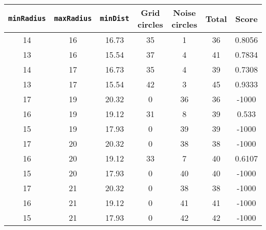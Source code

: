 \documentclass[letterpaper, 12pt]{article}
\begin{document}
\begin{longtable}{|c|c|c|c|c|c|c|}
\hline
\textbf{\texttt{minRadius}} & \textbf{\texttt{maxRadius}} & \textbf{\texttt{minDist}} & \textbf{Grid circles} & \textbf{Noise circles} & \textbf{Total} & \textbf{Score} \\
\hline
14 & 16 & 16.73 & 35 & 1 & 36 & 0.8056 \\
\hline
13 & 16 & 15.54 & 37 & 4 & 41 & 0.7834 \\
\hline
14 & 17 & 16.73 & 35 & 4 & 39 & 0.7308 \\
\hline
13 & 17 & 15.54 & 42 & 3 & 45 & 0.9333 \\
\hline
17 & 19 & 20.32 & 0 & 36 & 36 & -1000 \\
\hline
16 & 19 & 19.12 & 31 & 8 & 39 & 0.533 \\
\hline
15 & 19 & 17.93 & 0 & 39 & 39 & -1000 \\
\hline
17 & 20 & 20.32 & 0 & 38 & 38 & -1000 \\
\hline
16 & 20 & 19.12 & 33 & 7 & 40 & 0.6107 \\
\hline
15 & 20 & 17.93 & 0 & 40 & 40 & -1000 \\
\hline
17 & 21 & 20.32 & 0 & 38 & 38 & -1000 \\
\hline
16 & 21 & 19.12 & 0 & 41 & 41 & -1000 \\
\hline
15 & 21 & 17.93 & 0 & 42 & 42 & -1000 \\
\hline
\end{longtable}
\end{document}
